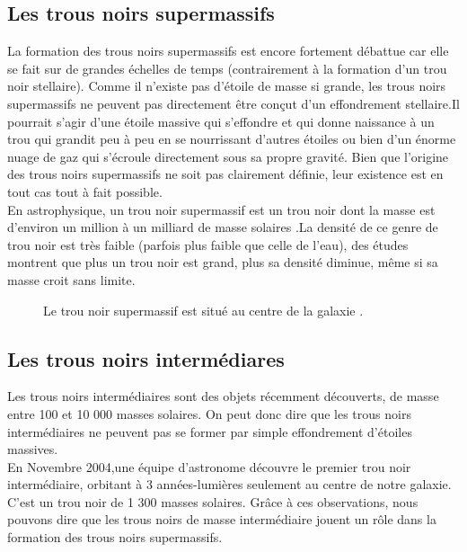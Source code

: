 	\subsection{ Les trous noirs supermassifs }
	La formation des trous noirs supermassifs est encore fortement débattue car elle se fait sur de grandes échelles de temps (contrairement à la formation d’un trou noir stellaire). Comme il n’existe pas d’étoile de masse si grande, les trous noirs supermassifs ne peuvent pas directement être conçut d’un effondrement stellaire.Il pourrait s’agir d’une étoile massive qui s’effondre et qui donne naissance à un trou qui grandit peu à peu en se nourrissant d’autres étoiles ou bien d’un énorme nuage de gaz qui s’écroule directement sous sa propre gravité. Bien que l’origine des trous noirs supermassifs ne soit pas clairement définie, leur existence est en tout cas tout à fait possible.\\ 
	En astrophysique, un trou noir supermassif est un trou noir dont la masse est d’environ un million à un milliard de masse solaires .La densité de ce genre de trou noir  est très faible (parfois plus faible que celle de l’eau), des études montrent que plus un trou noir est grand, plus sa densité diminue, même si sa masse croit sans limite.
	\begin{figure}[H]
			\begin{center}
		
	\end{center}

	 \caption{Le trou noir supermassif est situé au centre de la galaxie .}
	
	\end{figure}
	\subsection{ Les trous noirs intermédiares }
	Les trous noirs intermédiaires sont des objets récemment découverts, de masse entre 100 et
	10 000 masses solaires. On peut donc dire que les trous noirs intermédiaires ne peuvent pas se former par simple effondrement d’étoiles massives.\\
	En Novembre 2004,une équipe d’astronome découvre le premier trou noir intermédiaire, orbitant à 3 années-lumières seulement au centre de notre galaxie. C’est un trou noir de 1 300 masses solaires. Grâce à ces observations, nous pouvons dire que les trous noirs de masse intermédiaire jouent un rôle dans la formation des trous noirs supermassifs.
